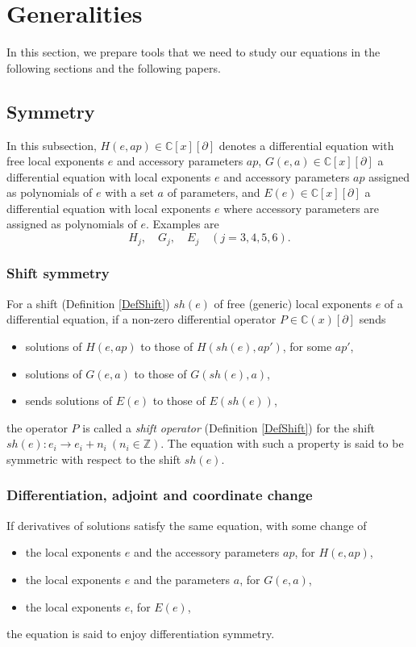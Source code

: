 \documentclass[a4paper,12pt]{article}
\theoremstyle{definition}
\theoremstyle{remark}
\numberwithin{equation}{section} %
\begin{document}
\section{Generalities}\label{Gen}%
\setcounter{stc}{3}
\secttoc
In this section, we prepare tools that we need to study
our equations in the following sections and the following papers.

\subsection{ Symmetry}\label{GenSym}
In this subsection, $H(e,ap)\in\mathbb{C}[x][\partial]$ denotes a differential equation with free local exponents $e$ and accessory parameters $ap$, 
$G(e,a)\in\mathbb{C}[x][\partial]$ a differential equation with local exponents $e$ and accessory parameters $ap$ assigned as polynomials of $e$ with a set $a$ of parameters, and
$E(e)\in\mathbb{C}[x][\partial]$ a differential equation with local exponents $e$ where accessory parameters are assigned as polynomials of $e$. %
Examples are
$$H_j,\quad G_j,\quad E_j\quad (j=3,4,5,6).$$
\subsubsection{Shift symmetry}
For a shift (Definition \ref{DefShift})  $sh(e)$ of free (generic) local exponents $e$ of a differential equation, if a non-zero differential operator $P\in\mathbb{C}(x)[\partial]$ sends
\begin{itemize}
     \item    solutions of $H(e,ap)$  to those of $H(sh(e),ap')$, for some $ap'$, 
     \item   solutions of $G(e,a)$  to those of $G(sh(e),a)$,
 \item   sends solutions of $E(e)$  to those of $E(sh(e))$,
\end{itemize}
     the operator $P$ is called a {\it shift operator} (Definition \ref{DefShift})  for the shift $sh(e):e_i\to e_i+n_i\ (n_i\in\mathbb{Z})$. The equation with such a property is said to be symmetric with respect to the shift $sh(e)$. 
\subsubsection{Differentiation, adjoint and coordinate change }
   If derivatives of solutions satisfy  the same equation, with some change of 
     \begin{itemize}
     \item the local exponents $e$ and the accessory parameters $ap$, for $H(e,ap)$, 
     \item the local exponents $e$ and the parameters  $a$, for $G(e,a)$,
\item  the local exponents $e$, for $E(e)$,
     \end{itemize}
     the equation is said to enjoy differentiation symmetry. %
\end{document}
